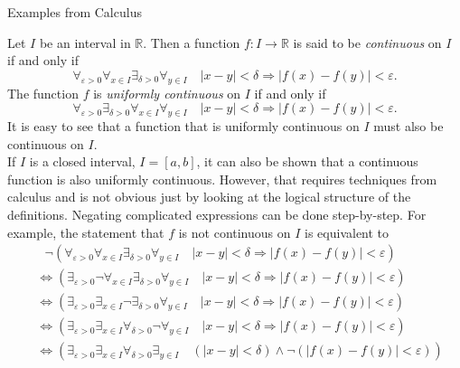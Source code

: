 \documentclass[smaller,hyperref={CJKbookmarks=true}]{beamer}
\newcommand{\R}{\mathbb{R}}
\begin{document}
\begin{frame}{Examples from Calculus}
\begin{spacing}{1.05}
Let $I$ be an interval in $\R$. Then a function $f\!:I\to\R$ is said to be \emph{continuous} on $I$ if and only if
\[\mathop{\forall}_{\varepsilon>0}\mathop{\forall}_{x\in I}\mathop{\exists}_{\delta>0}\mathop{\forall}_{y\in I}\quad\vert x-y\vert<\delta\Rightarrow\vert f(x)-f(y)\vert<\varepsilon.\]
The function $f$ is \emph{uniformly continuous} on $I$ if and only if
\[\mathop{\forall}_{\varepsilon>0}\mathop{\exists}_{\delta>0}
\mathop{\forall}_{x\in I}\mathop{\forall}_{y\in I}\quad\vert x-y\vert<\delta\Rightarrow\vert f(x)-f(y)\vert<\varepsilon.\]
It is easy to see that a function that is uniformly continuous on $I$ must
also be continuous on $I$.\\[5pt]
If $I$ is a closed interval, $I=[a,b]$, it can also be shown that a continuous
function is also uniformly continuous. However, that requires techniques
from calculus and is not obvious just by looking at the logical structure of
the definitions.
\newpage
Negating complicated expressions can be done step-by-step. For example, the statement that $f$ is not continuous on $I$ is equivalent to
\begin{align*}
   &~~~\neg\!\left(\mathop{\forall}_{\varepsilon>0}
   \mathop{\forall}_{x\in I}\mathop{\exists}_{\delta>0}
   \mathop{\forall}_{y\in I}\quad
   \vert x-y\vert<\delta\Rightarrow\vert
   f(x)-f(y)\vert<\varepsilon\right)  \\
   &\Leftrightarrow\left(\mathop{\exists}_{\varepsilon>0}
   \neg\mathop{\forall}_{x\in I}\mathop{\exists}_{\delta>0}\mathop{\forall}_{y\in I}\quad\vert x-y\vert<\delta\Rightarrow\vert
   f(x)-f(y)\vert<\varepsilon\right)  \\
   &\Leftrightarrow\left(\mathop{\exists}_{\varepsilon>0}
   \mathop{\exists}_{x\in I}\neg\mathop{\exists}_{\delta>0}\mathop{\forall}_{y\in I}\quad\vert x-y\vert<\delta\Rightarrow\vert
   f(x)-f(y)\vert<\varepsilon\right)  \\
   &\Leftrightarrow\left(\mathop{\exists}_{\varepsilon>0}
   \mathop{\exists}_{x\in I}\mathop{\forall}_{\delta>0}\neg\mathop{\forall}_{y\in I}\quad\vert x-y\vert<\delta\Rightarrow\vert
   f(x)-f(y)\vert<\varepsilon\right)  \\
   &\Leftrightarrow\left(\mathop{\exists}_{\varepsilon>0}
   \mathop{\exists}_{x\in I}\mathop{\forall}_{\delta>0}\mathop{\exists}_{y\in I}\quad(\vert x-y\vert<\delta)\wedge\neg(\vert f(x)-f(y)\vert<\varepsilon)\right)  \\

\end{align*}
\end{spacing}
\end{frame}
\end{document}
